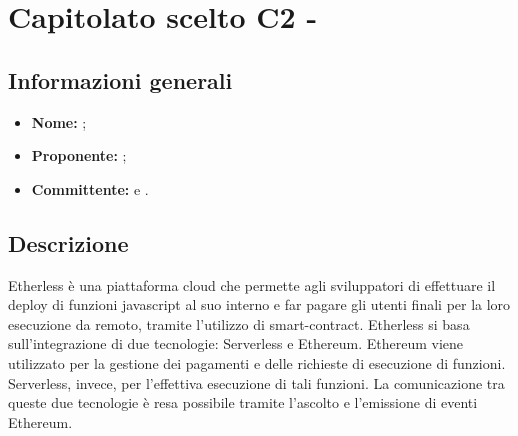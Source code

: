 \section{Capitolato scelto C2 - \NomeProgetto}

\subsection{Informazioni generali}
	\begin{itemize}
		\item \textbf{Nome:} \NomeProgetto{}; 
		\item \textbf{Proponente}\textbf{:} \Proponente{};
		\item \textbf{Committente}\textbf{:} \TV{} e \RC{}. 
	\end{itemize}

\subsection{Descrizione}
Etherless è una piattaforma cloud che permette agli sviluppatori di effettuare il deploy di funzioni javascript al suo interno e far pagare gli utenti finali per la loro esecuzione da remoto, tramite l'utilizzo di smart-contract. Etherless si basa sull'integrazione di due tecnologie: Serverless e Ethereum. Ethereum viene utilizzato per la gestione dei pagamenti e delle richieste di esecuzione di funzioni. Serverless, invece, per l'effettiva esecuzione di tali funzioni. La comunicazione tra queste due tecnologie è resa possibile tramite l'ascolto e l'emissione di eventi Ethereum.

